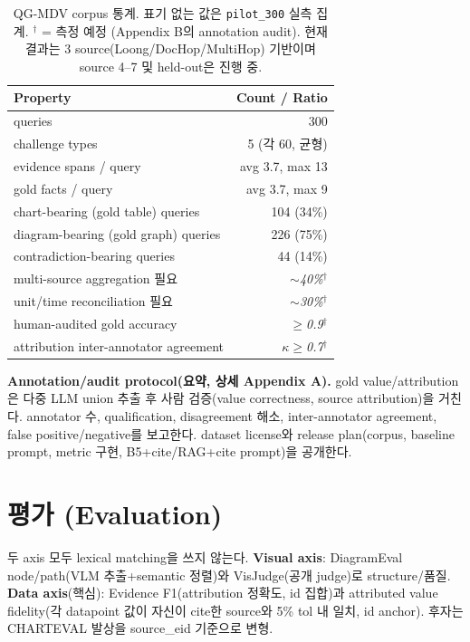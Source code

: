 \documentclass[11pt]{article}
\newcommand{\proj}[1]{\textit{#1}$^\dagger$}
\begin{document}
\begin{table}[h]
\centering\small
\begin{tabular}{lr}
\toprule
Property & Count / Ratio \\
\midrule
queries & 300 \\
challenge types & 5 (각 60, 균형) \\
evidence spans / query & avg 3.7, max 13 \\
gold facts / query & avg 3.7, max 9 \\
chart-bearing (gold table) queries & 104 (34\%) \\
diagram-bearing (gold graph) queries & 226 (75\%) \\
contradiction-bearing queries & 44 (14\%) \\
multi-source aggregation 필요 & \proj{$\sim$40\%} \\
unit/time reconciliation 필요 & \proj{$\sim$30\%} \\
human-audited gold accuracy & \proj{$\geq$0.9} \\
attribution inter-annotator agreement & \proj{$\kappa\geq$0.7} \\
\bottomrule
\end{tabular}
\caption{QG-MDV corpus 통계. 표기 없는 값은 \texttt{pilot\_300} 실측 집계. $^\dagger$ = 측정 예정
(Appendix B의 annotation audit). 현재 결과는 3 source(Loong/DocHop/MultiHop) 기반이며 source 4--7
및 held-out은 진행 중.}
\label{tab:corpus}
\end{table}

\textbf{Annotation/audit protocol(요약, 상세 Appendix A).} gold value/attribution은 다중 LLM
union 추출 후 사람 검증(value correctness, source attribution)을 거친다. annotator 수,
qualification, disagreement 해소, inter-annotator agreement, false positive/negative를 보고한다.
dataset license와 release plan(corpus, baseline prompt, metric 구현, B5+cite/RAG+cite prompt)을
공개한다.

\section{평가 (Evaluation)}
\label{sec:eval}
두 axis 모두 lexical matching을 쓰지 않는다. \textbf{Visual axis}: DiagramEval node/path(VLM
추출+semantic 정렬)와 VisJudge(공개 judge)로 structure/품질. \textbf{Data axis}(핵심): Evidence
F1(attribution 정확도, id 집합)과 attributed value fidelity(각 datapoint 값이 자신이 cite한
source와 5\% tol 내 일치, id anchor). 후자는 CHARTEVAL 발상을 source\_eid 기준으로 변형.
\end{document}

